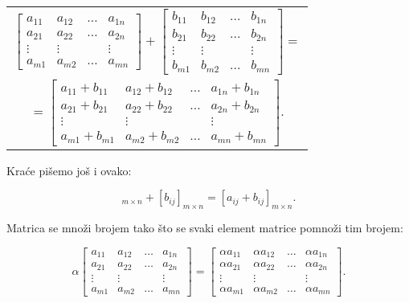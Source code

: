 \documentclass[11pt]{article}
\theoremstyle{masulthm}
\theoremstyle{masuldef}
\theoremstyle{masulexmp}
\theoremstyle{masulproof}
\begin{document}
\begin{center}
    \begin{tabular}{c}
            $\begin{bmatrix}
                a_{11} & a_{12} & \dots & a_{1n} \\
                a_{21} & a_{22} & \dots & a_{2n} \\
                \vdots & \vdots &       & \vdots \\
                a_{m1} & a_{m2} & \dots & a_{mn}
            \end{bmatrix}
            +
            \begin{bmatrix}
                b_{11} & b_{12} & \dots & b_{1n} \\
                b_{21} & b_{22} & \dots & b_{2n} \\
                \vdots & \vdots &       & \vdots \\
                b_{m1} & b_{m2} & \dots & b_{mn}
            \end{bmatrix}
            = $\\
            $= \begin{bmatrix}
                a_{11} + b_{11} & a_{12} + b_{12} & \dots & a_{1n} + b_{1n} \\
                a_{21} + b_{21} & a_{22} + b_{22} & \dots & a_{2n} + b_{2n} \\
                \vdots & \vdots &       & \vdots \\
                a_{m1} + b_{m1} & a_{m2} + b_{m2} & \dots & a_{mn} + b_{mn}
            \end{bmatrix}.$
    \end{tabular}
\end{center}

\noindent
Kraće pišemo još i ovako:

\begin{equation*}
    [a_{ij}]_{m \times n} + [b_{ij}]_{m \times n} = [a_{ij} + b_{ij}]_{m \times n}.
\end{equation*}

\noindent
Matrica se množi brojem tako što se svaki element matrice pomnoži tim brojem:

\begin{equation*}
    \alpha
    \begin{bmatrix}
        a_{11} & a_{12} & \dots & a_{1n} \\
        a_{21} & a_{22} & \dots & a_{2n} \\
        \vdots & \vdots &       & \vdots \\
        a_{m1} & a_{m2} & \dots & a_{mn}
    \end{bmatrix}
    =
    \begin{bmatrix}
        \alpha a_{11} & \alpha a_{12} & \dots & \alpha a_{1n} \\
        \alpha a_{21} & \alpha a_{22} & \dots & \alpha a_{2n} \\
        \vdots & \vdots &       & \vdots \\
        \alpha a_{m1} & \alpha a_{m2} & \dots & \alpha a_{mn}
    \end{bmatrix}.
\end{equation*}
\end{document}
